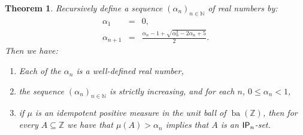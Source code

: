 \documentclass{jloganal}
\newtheorem{thm}{Theorem}[section]    %
\newtheorem{lem}[thm]{Lemma}          %
\theoremstyle{definition}
\newcommand{\ba}{\mathop{\mathrm{ba}}}
\newcommand{\ip}{\mathnormal{\mathsf{IP}}}
\begin{document}



\begin{thm}\label{sequencebounds}
Recursively define a sequence $(\alpha_n)_{n\in\mathbb N}$ of real numbers by:
\begin{eqnarray*}
    \alpha_1 & = & 0, \\
    \alpha_{n+1} & = & \frac{\alpha_n -1 +\sqrt{\alpha_n^2-2\alpha_n+5}}{2}.
\end{eqnarray*}
Then we have:
\begin{enumerate}
    \item Each of the $\alpha_n$ is a well-defined real number,
    \item the sequence $(\alpha_n)_{n\in\mathbb N}$ is strictly increasing, and for each $n$, $0\leq\alpha_n<1$,
    \item if $\mu$ is an idempotent positive measure in the unit ball of $\ba(\mathbb Z)$, then for every $A\subseteq\mathbb Z$ we have that $\mu(A)>\alpha_n$ implies that $A$ is an $\ip_n$-set.
\end{enumerate}
\end{thm}
\end{document}
